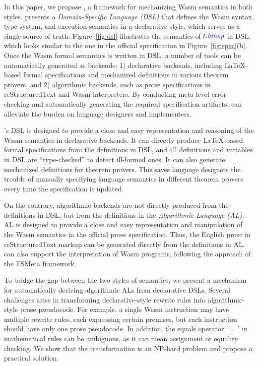 In this paper, we propose \spectec, a framework for mechanizing Wasm semantics in both styles.
\spectec presents a \emph{Domain-Specific Language (DSL)} that
defines the Wasm syntax, type system, and execution semantics in a declarative style,
which serves as a single source of truth.
Figure~\ref{fig:dsl} illustrates the semantics of $t.\mathit{{\color{blue}{binop}}}$ in DSL,
which looks similar to the one in the official specification in Figure~\ref{fig:spec}(b).
Once the Wasm formal semantics is written in DSL,
a number of tools can be automatically generated as backends:
1) declarative backends, including LaTeX-based formal specifications and
mechanized definitions in various theorem provers, and
2) algorithmic backends, such as prose specifications in reStructuredText and Wasm interpreters.
By conducting meta-level error checking and automatically generating the required specification artifacts,
\spectec can alleviate the burden on language designers and implementers.

\spectec's DSL is designed to provide a close and easy representation and reasoning of
the Wasm semantics in declarative backends.
It can directly produce LaTeX-based formal specifications from the definitions in DSL,
and all definitions and variables in DSL are ``type-checked'' to detect ill-formed ones.
It can also generate mechanized definitions for theorem provers.
This saves language designers the trouble of manually specifying
language semantics in different theorem provers every time the specification is updated.

On the contrary, algorithmic backends are not directly produced from the definitions in DSL,
but from the definitions in the \emph{Algorithmic Language (AL)}.
AL is designed to provide a close and easy representation and manipulation of
the Wasm semantics in the official prose specification.
Thus, the English prose in reStructuredText markup can be generated directly from the definitions in AL.
\spectec can also support the interpretation of Wasm programs,
following the approach of the ESMeta framework.

To bridge the gap between the two styles of semantics,
we present a mechanism for automatically deriving algorithmic ALs from declarative DSLs.
Several challenges arise in transforming declarative-style rewrite rules
into algorithmic-style prose pseudocode.
For example, a single Wasm instruction may have multiple rewrite rules,
each expressing certain premises,
but each instruction should have only one prose pseudocode. 
In addition, the equals operator `$=$' in mathematical rules
can be ambiguous, as it can mean assignment or equality checking.
We show that the transformation is an NP-hard problem
and propose a practical solution.

